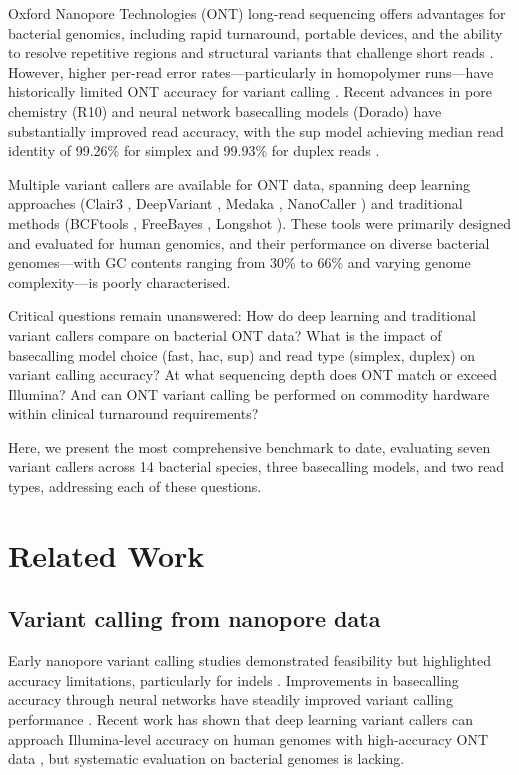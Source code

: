 \documentclass[11pt]{article}
\begin{document}
Oxford Nanopore Technologies (ONT) long-read sequencing offers advantages for bacterial genomics, including rapid turnaround, portable devices, and the ability to resolve repetitive regions and structural variants that challenge short reads \citep{jain2016,wang2021}. However, higher per-read error rates---particularly in homopolymer runs---have historically limited ONT accuracy for variant calling \citep{wick2019}. Recent advances in pore chemistry (R10) and neural network basecalling models (Dorado) have substantially improved read accuracy, with the sup model achieving median read identity of 99.26\% for simplex and 99.93\% for duplex reads \citep{deschamps2023}.

Multiple variant callers are available for ONT data, spanning deep learning approaches (Clair3 \citep{zheng2022}, DeepVariant \citep{poplin2018}, Medaka \citep{medaka2023}, NanoCaller \citep{ahsan2021}) and traditional methods (BCFtools \citep{danecek2021}, FreeBayes \citep{garrison2012}, Longshot \citep{edge2019}). These tools were primarily designed and evaluated for human genomics, and their performance on diverse bacterial genomes---with GC contents ranging from 30\% to 66\% and varying genome complexity---is poorly characterised.

Critical questions remain unanswered: How do deep learning and traditional variant callers compare on bacterial ONT data? What is the impact of basecalling model choice (fast, hac, sup) and read type (simplex, duplex) on variant calling accuracy? At what sequencing depth does ONT match or exceed Illumina? And can ONT variant calling be performed on commodity hardware within clinical turnaround requirements?

Here, we present the most comprehensive benchmark to date, evaluating seven variant callers across 14 bacterial species, three basecalling models, and two read types, addressing each of these questions.

\section{Related Work}

\subsection{Variant calling from nanopore data}
Early nanopore variant calling studies demonstrated feasibility but highlighted accuracy limitations, particularly for indels \citep{loose2019,loman2015}. Improvements in basecalling accuracy through neural networks have steadily improved variant calling performance \citep{wick2019}. Recent work has shown that deep learning variant callers can approach Illumina-level accuracy on human genomes with high-accuracy ONT data \citep{shafin2020}, but systematic evaluation on bacterial genomes is lacking.
\end{document}

